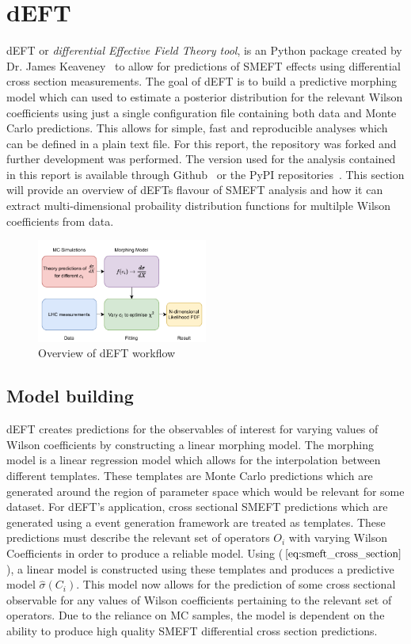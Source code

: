 \documentclass[a4paper,11pt]{article}
\begin{document}
\section{dEFT}\label{sec:deft}

dEFT or \emph{differential Effective Field Theory tool}, is an Python package created by Dr. James Keaveney~\cite{Keaveney_dEFT} to allow for predictions of SMEFT effects using differential cross section measurements.
The goal of dEFT is to build a predictive morphing model which can used to estimate a posterior distribution for the relevant Wilson coefficients using just a single configuration file containing both data and Monte Carlo predictions.
This allows for simple, fast and reproducible analyses which can be defined in a plain text file.
For this report, the repository was forked and further development was performed.
The version used for the analysis contained in this report is available through Github~\cite{codecalec_dEFT} or the PyPI repositories~\cite{pypi_dEFT}.
This section will provide an overview of dEFTs flavour of SMEFT analysis and how it can extract multi-dimensional probaility distribution functions for multilple Wilson coefficients from data.

\begin{figure}[htb]
    \centering
    \includegraphics[width=0.5\textwidth]{images/deft-workflow.pdf}
    \caption{Overview of dEFT workflow}
\end{figure}

\subsection{Model building}
dEFT creates predictions for the observables of interest for varying values of Wilson coefficients by constructing a linear morphing model.
The morphing model is a linear regression model which allows for the interpolation between different templates.
These templates are Monte Carlo predictions which are generated around the region of parameter space which would be relevant for some dataset.
For dEFT's application, cross sectional SMEFT predictions which are generated using a event generation framework are treated as templates.
These predictions must describe the relevant set of operators $O_{i}$ with varying Wilson Coefficients in order to produce a reliable model.
Using ($\ref{eq:smeft_cross_section}$), a linear model is constructed using these templates and produces a predictive model $\hat{\sigma}({C_i})$.
This model now allows for the prediction of some cross sectional observable for any values of Wilson coefficients pertaining to the relevant set of operators.
Due to the reliance on MC samples, the model is dependent on the ability to produce high quality SMEFT differential cross section predictions.
\end{document}

